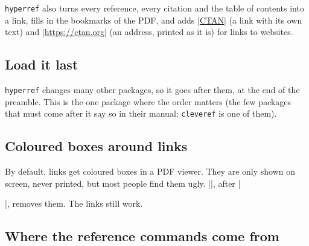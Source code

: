
\texttt{hyperref} also turns every reference, every citation and the table of contents into a link,
fills in the bookmarks of the PDF,
and adds \code|\href{https://ctan.org}{CTAN}| (a link with its own text)
and \code|\url{https://ctan.org}| (an address, printed as it is) for links to websites.

\subsection{Load it last}

\texttt{hyperref} changes many other packages, so it goes after them, at the end of the preamble.
This is the one package where the order matters
(the few packages that must come after it say so in their manual; \texttt{cleveref} is one of them).

\subsection{Coloured boxes around links}

By default, links get coloured boxes in a PDF viewer.
They are only shown on screen, never printed, but most people find them ugly.
\code|\hypersetup{hidelinks}|, after \code|\usepackage{hyperref}|, removes them.
The links still work.

\subsection{Where the reference commands come from}

